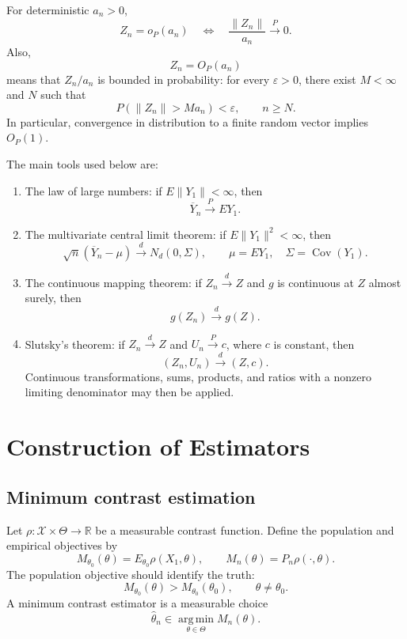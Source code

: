 For deterministic $a_n>0$,
\[
Z_n=o_P(a_n)
\quad\Longleftrightarrow\quad
\frac{\|Z_n\|}{a_n}\xrightarrow{P}0.
\]
Also,
\[
Z_n=O_P(a_n)
\]
means that $Z_n/a_n$ is bounded in probability: for every
$\varepsilon>0$, there exist $M<\infty$ and $N$ such that
\[
P(\|Z_n\|>Ma_n)<\varepsilon,
\qquad n\geq N.
\]
In particular, convergence in distribution to a finite random
vector implies $O_P(1)$.

The main tools used below are:
\begin{enumerate}
\item The law of large numbers:
if $E\|Y_1\|<\infty$, then
\[
\overline Y_n\xrightarrow{P}EY_1.
\]

\item The multivariate central limit theorem:
if $E\|Y_1\|^2<\infty$, then
\[
\sqrt n(\overline Y_n-\mu)
\xrightarrow{d}N_d(0,\Sigma),
\qquad
\mu=EY_1,\quad \Sigma=\operatorname{Cov}(Y_1).
\]

\item The continuous mapping theorem:
if $Z_n\xrightarrow{d}Z$ and $g$ is continuous at $Z$ almost surely,
then
\[
g(Z_n)\xrightarrow{d}g(Z).
\]

\item Slutsky's theorem:
if $Z_n\xrightarrow{d}Z$ and $U_n\xrightarrow{P}c$, where $c$ is
constant, then
\[
(Z_n,U_n)\xrightarrow{d}(Z,c).
\]
Continuous transformations, sums, products, and ratios with a
nonzero limiting denominator may then be applied.
\end{enumerate}

\section{Construction of Estimators}

\subsection{Minimum contrast estimation}

Let $\rho:\mathcal X\times\Theta\to\mathbb R$ be a measurable
contrast function. Define the population and empirical objectives by
\[
M_{\theta_0}(\theta)=E_{\theta_0}\rho(X_1,\theta),
\qquad
M_n(\theta)=P_n\rho(\cdot,\theta).
\]
The population objective should identify the truth:
\[
M_{\theta_0}(\theta)>M_{\theta_0}(\theta_0),
\qquad \theta\neq\theta_0.
\]
A minimum contrast estimator is a measurable choice
\[
\widehat\theta_n\in
\operatorname*{arg\,min}_{\theta\in\Theta}M_n(\theta).
\]

